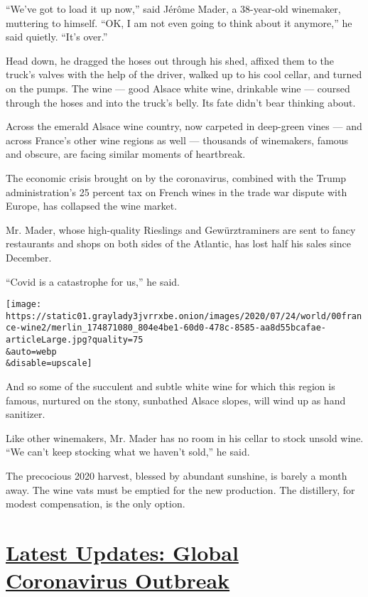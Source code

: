 ``We've got to load it up now,'' said Jérôme Mader, a 38-year-old
winemaker, muttering to himself. ``OK, I am not even going to think
about it anymore,'' he said quietly. ``It's over.''

Head down, he dragged the hoses out through his shed, affixed them to
the truck's valves with the help of the driver, walked up to his cool
cellar, and turned on the pumps. The wine --- good Alsace white wine,
drinkable wine --- coursed through the hoses and into the truck's belly.
Its fate didn't bear thinking about.

Across the emerald Alsace wine country, now carpeted in deep-green vines
--- and across France's other wine regions as well --- thousands of
winemakers, famous and obscure, are facing similar moments of
heartbreak.

The economic crisis brought on by the coronavirus, combined with the
Trump administration's 25 percent tax on French wines in the trade war
dispute with Europe, has collapsed the wine market.

Mr. Mader, whose high-quality Rieslings and Gewürztraminers are sent to
fancy restaurants and shops on both sides of the Atlantic, has lost half
his sales since December.

``Covid is a catastrophe for us,'' he said.

\texttt{[image: https://static01.graylady3jvrrxbe.onion/images/2020/07/24/world/00france-wine2/merlin\_174871080\_804e4be1-60d0-478c-8585-aa8d55bcafae-articleLarge.jpg?quality=75\\\&auto=webp\\\&disable=upscale]}

And so some of the succulent and subtle white wine for which this region
is famous, nurtured on the stony, sunbathed Alsace slopes, will wind up
as hand sanitizer.

Like other winemakers, Mr. Mader has no room in his cellar to stock
unsold wine. ``We can't keep stocking what we haven't sold,'' he said.

The precocious 2020 harvest, blessed by abundant sunshine, is barely a
month away. The wine vats must be emptied for the new production. The
distillery, for modest compensation, is the only option.

\hypertarget{latest-updates-global-coronavirus-outbreak}{%
\section{\texorpdfstring{\href{https://www.nytimes3xbfgragh.onion/2020/08/01/world/coronavirus-covid-19.html?action=click\&pgtype=Article\&state=default\&region=MAIN_CONTENT_1\&context=storylines_live_updates}{Latest
Updates: Global Coronavirus
Outbreak}}{Latest Updates: Global Coronavirus Outbreak}}\label{latest-updates-global-coronavirus-outbreak}}

